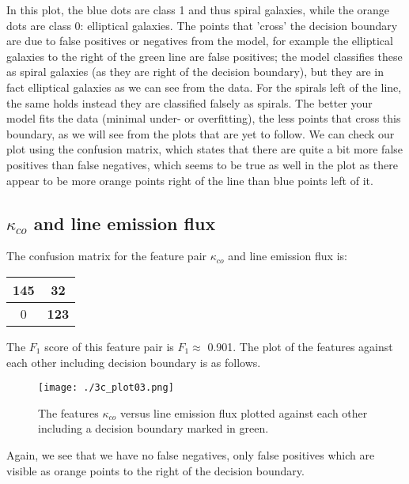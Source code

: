 In this plot, the blue dots are class 1 and thus spiral galaxies, while the orange dots are class 0: elliptical galaxies. The points that 'cross' the decision boundary are due to false positives or negatives from the model, for example the elliptical galaxies to the right of the green line are false positives; the model classifies these as spiral galaxies (as they are right of the decision boundary), but they are in fact elliptical galaxies as we can see from the data. For the spirals left of the line, the same holds instead they are classified falsely as spirals. The better your model fits the data (minimal under- or overfitting), the less points that cross this boundary, as we will see from the plots that are yet to follow. We can check our plot using the confusion matrix, which states that there are quite a bit more false positives than false negatives, which seems to be true as well in the plot as there appear to be more orange points right of the line than blue points left of it. 

\subsection*{$\kappa_{co}$ and line emission flux}

The confusion matrix for the feature pair $\kappa_{co}$ and line emission flux is:

\begin{table}[!h]
\centering
\begin{tabular}{c|c}
\textbf{145} & 32\\ \hline
0 &   \textbf{123}\\
\end{tabular}
\end{table}

The $F_1$ score of this feature pair is $F_1 \approx$ 0.901. The plot of the features against each other including decision boundary is as follows.\\

\begin{figure}[h!]
  \centering
  \texttt{[image: ./3c\_plot03.png]}
  \caption{The features $\kappa_{co}$ versus line emission flux plotted against each other including a decision boundary marked in green.}
\end{figure}

Again, we see that we have no false negatives, only false positives which are visible as orange points to the right of the decision boundary. 

